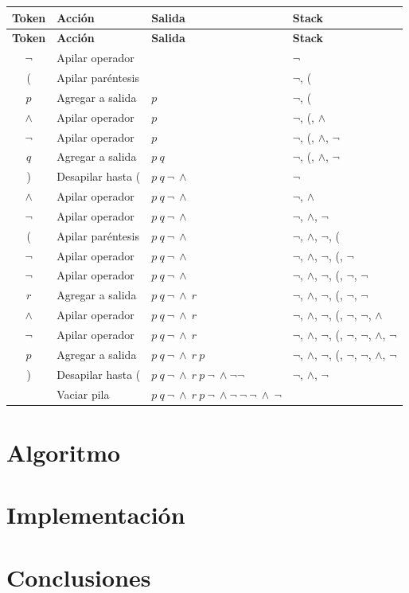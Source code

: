 \documentclass{report}
\begin{document}
	\begin{center}
		\begin{longtable}{|c|l|l|l|}
			\hline
			\textbf{Token} & \textbf{Acción} & \textbf{Salida} & \textbf{Stack} \\
			\hline
			\endfirsthead
			\hline
			\textbf{Token} & \textbf{Acción} & \textbf{Salida} & \textbf{Stack} \\
			\hline
			\endhead
			
			$\neg$ & Apilar operador & & $\neg$ \\
			\hline
			( & Apilar paréntesis & & $\neg$, ( \\
			\hline
			$p$ & Agregar a salida & $p$ & $\neg$, ( \\
			\hline
			$\wedge$ & Apilar operador & $p$ & $\neg$, (, $\wedge$ \\
			\hline
			$\neg$ & Apilar operador & $p$ & $\neg$, (, $\wedge$, $\neg$ \\
			\hline
			$q$ & Agregar a salida & $p\ q$ & $\neg$, (, $\wedge$, $\neg$ \\
			\hline
			) & Desapilar hasta ( & $p\ q\ \neg\ \wedge$ & $\neg$ \\
			\hline
			$\wedge$ & Apilar operador & $p\ q\ \neg\ \wedge$ & $\neg$, $\wedge$ \\
			\hline
			$\neg$ & Apilar operador & $p\ q\ \neg\ \wedge$ & $\neg$, $\wedge$, $\neg$ \\
			\hline
			( & Apilar paréntesis & $p\ q\ \neg\ \wedge$ & $\neg$, $\wedge$, $\neg$, ( \\
			\hline
			$\neg$ & Apilar operador & $p\ q\ \neg\ \wedge$ & $\neg$, $\wedge$, $\neg$, (, $\neg$ \\
			\hline
			$\neg$ & Apilar operador & $p\ q\ \neg\ \wedge$ & $\neg$, $\wedge$, $\neg$, (, $\neg$, $\neg$ \\
			\hline
			$r$ & Agregar a salida & $p\ q\ \neg\ \wedge\ r$ & $\neg$, $\wedge$, $\neg$, (, $\neg$, $\neg$ \\
			\hline
			$\wedge$ & Apilar operador & $p\ q\ \neg\ \wedge\ r$ & $\neg$, $\wedge$, $\neg$, (, $\neg$, $\neg$, $\wedge$ \\
			\hline
			$\neg$ & Apilar operador & $p\ q\ \neg\ \wedge\ r$ & $\neg$, $\wedge$, $\neg$, (, $\neg$, $\neg$, $\wedge$, $\neg$ \\
			\hline
			$p$ & Agregar a salida & $p\ q\ \neg\ \wedge\ r\ p$ & $\neg$, $\wedge$, $\neg$, (, $\neg$, $\neg$, $\wedge$, $\neg$ \\
			\hline
			) & Desapilar hasta ( & $p\ q\ \neg\ \wedge\ r\ p\ \neg\ \wedge \neg \neg$ & $\neg$, $\wedge$, $\neg$ \\
			\hline
			& Vaciar pila & $p\ q\ \neg\ \wedge\ r\ p\ \neg\ \wedge \neg\ \neg\ \neg\ \wedge\ \neg$ &  \\
			\hline
		\end{longtable}
	\end{center}
	\section{Algoritmo}
	\section{Implementaci\'on}
	
	\section{Conclusiones}
	
\end{document}
